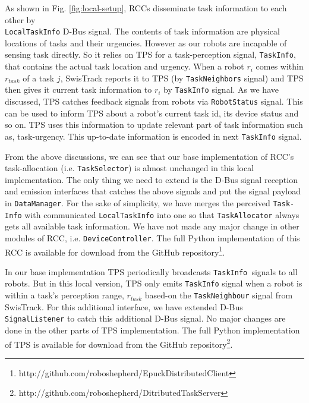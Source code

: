 \documentclass[final,5p,times,twocolumn]{elsarticle}
\begin{document}
As shown in Fig. \ref{fig:local-setup}, RCCs disseminate task information to each other by\\ \texttt{LocalTaskInfo} D-Bus signal. The contents of task information are physical locations of tasks and their urgencies. However as our robots are incapable of sensing task directly. So it relies on TPS for a task-perception signal, \texttt{TaskInfo}, that contains the actual task location and urgency. When a robot $r_i$ comes within $r_{task}$ of a task $j$, SwisTrack reports it to TPS (by \texttt{TaskNeighbors} signal) and TPS then gives it current task information to $r_i$ by  \texttt{TaskInfo} signal. As we have discussed, TPS catches feedback signals from robots via \texttt{RobotStatus} signal. This can be used to inform TPS about a robot's current task id, its device status and so on. TPS uses this information to update relevant part of task information such as, task-urgency. This up-to-date information is encoded in next \texttt{TaskInfo} signal.

From the above discussions, we can see that our base implementation of RCC's task-allocation (i.e. \texttt{TaskSelector}) is almost unchanged in this local implementation. The only thing we need to extend is the D-Bus signal reception and emission interfaces that catches the above signals and put the signal payload in \texttt{DataManager}. For the sake of simplicity, we have merges the perceived \texttt{Task-}\\ \texttt{Info} with communicated \texttt{LocalTaskInfo} into one so that \texttt{TaskAllocator} always gets all available task information. We have not made any major change in other modules of RCC, i.e. \texttt{DeviceController}. The full Python implementation of this RCC is available for download from the GitHub repository\footnote{http://github.com/roboshepherd/EpuckDistributedClient }.

In our base implementation TPS periodically broadcasts \texttt{TaskInfo }signals to all robots. But in this local version, TPS only emits \texttt{TaskInfo} signal when a robot is within a task's perception range, $r_{task}$ based-on the \texttt{TaskNeighbour} signal from SwisTrack. For this additional interface, we have extended D-Bus \texttt{SignalListener} to catch this additional D-Bus signal.  No major changes are done in the other parts of TPS implementation. The full Python implementation of TPS is available for download from the GitHub repository\footnote{http://github.com/roboshepherd/DitributedTaskServer}.
\end{document}

